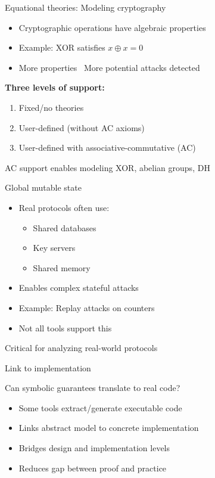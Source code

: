 \documentclass[aspectratio=169, lualatex, handout]{beamer}
\begin{document}
\begin{frame}{Equational theories: Modeling cryptography}
	\begin{itemize}
		\item Cryptographic operations have algebraic properties
		\item Example: XOR satisfies $x \oplus x = 0$
		\item More properties \rightarrow\ More potential attacks detected
	\end{itemize}
	\vspace{0.5em}
	\textbf{Three levels of support:}
	\begin{enumerate}
		\item Fixed/no theories
		\item User-defined (without AC axioms)
		\item User-defined with associative-commutative (AC)
	\end{enumerate}
	\vspace{0.5em}
	\begin{center}
		AC support enables modeling XOR, abelian groups, DH
	\end{center}
\end{frame}

\begin{frame}{Global mutable state}
	\begin{itemize}
		\item Real protocols often use:
		      \begin{itemize}
			      \item Shared databases
			      \item Key servers
			      \item Shared memory
		      \end{itemize}
		\item Enables complex stateful attacks
		\item Example: Replay attacks on counters
		\item Not all tools support this
	\end{itemize}
	\vspace{1em}
	\begin{center}
		\Large
		Critical for analyzing real-world protocols
	\end{center}
\end{frame}

\begin{frame}{Link to implementation}
	\begin{center}
		\Large
		Can symbolic guarantees translate to real code?
	\end{center}
	\vspace{1em}
	\begin{itemize}
		\item Some tools extract/generate executable code
		\item Links abstract model to concrete implementation
		\item Bridges design and implementation levels
		\item Reduces gap between proof and practice
	\end{itemize}
\end{frame}
\end{document}
